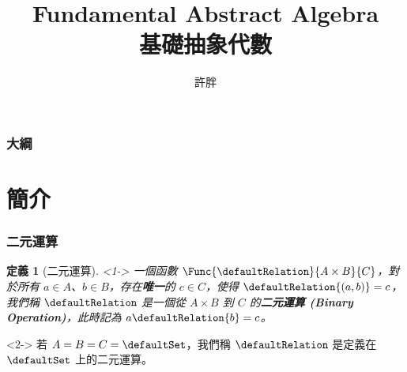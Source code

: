 \documentclass[utf8]{beamer}
\begin{document}
\begin{CJK}{UTF8}{bkai}

\newtheorem{mydef}{定義}[section]
\newtheorem*{mydef*}{定義}
\newtheorem{myrule}[mydef]{原理}
\newtheorem{mythm}[mydef]{定理}
\newtheorem{mycorol}[mydef]{推論}
\renewenvironment{proof}{\textbf{證明}}{\qed}
\newenvironment{mysol}{\textbf{解答}}{\qed}
\newenvironment{mypropo}{\begin{exampleblock}{性質}}{\end{exampleblock}}
\newenvironment{myexample}{\begin{exampleblock}{範例}}{\end{exampleblock}}
\newenvironment{mynote*}{\begin{alertblock}{註}}{\end{alertblock}}



\title{Fundamental Abstract Algebra\\基礎抽象代數}
\author{許胖}

\begin{frame}
  \titlepage
\end{frame}
\begin{frame}
  \frametitle{大綱}
  \tableofcontents
\end{frame}

\section{簡介}

\begin{frame}
  \frametitle{二元運算}
  \begin{mydef}[二元運算]<1->
  \label{def:algebra:binary_operation}
  一個函數 $\Func{\defaultRelation}{A\times{B}}{C}$，對於所有 $a\in{A}$、$b\in{B}$，存在\textbf{唯一}的 $c\in{C}$，使得 $\defaultRelation{(a,b)}=c$，我們稱 $\defaultRelation$ 是一個從 $A\times{B}$ 到 $C$ 的\textbf{二元運算 (Binary Operation)}，此時記為 $a\defaultRelation{b}=c$。
  \end{mydef}
  \begin{mynote*}<2->
  若 $A=B=C=\defaultSet$，我們稱 $\defaultRelation$ 是定義在 $\defaultSet$ 上的二元運算。
  \end{mynote*}
\end{frame}


\end{CJK}
\end{document}
